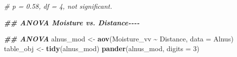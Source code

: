 \documentclass[
]{article}
\newenvironment{Shaded}{\begin{snugshade}}{\end{snugshade}}
\newcommand{\AttributeTok}[1]{\textcolor[rgb]{0.13,0.29,0.53}{#1}}
\newcommand{\CommentTok}[1]{\textcolor[rgb]{0.56,0.35,0.01}{\textit{#1}}}
\newcommand{\DecValTok}[1]{\textcolor[rgb]{0.00,0.00,0.81}{#1}}
\newcommand{\DocumentationTok}[1]{\textcolor[rgb]{0.56,0.35,0.01}{\textbf{\textit{#1}}}}
\newcommand{\FunctionTok}[1]{\textcolor[rgb]{0.13,0.29,0.53}{\textbf{#1}}}
\newcommand{\NormalTok}[1]{#1}
\newcommand{\OtherTok}[1]{\textcolor[rgb]{0.56,0.35,0.01}{#1}}
\newcommand{\SpecialCharTok}[1]{\textcolor[rgb]{0.81,0.36,0.00}{\textbf{#1}}}
\begin{document}
\begin{Shaded}
\begin{Highlighting}[]
\CommentTok{\# p = 0.58, df = 4, not significant. }

\DocumentationTok{\#\# ANOVA Moisture vs. Distance{-}{-}{-}{-}}

\DocumentationTok{\#\# ANOVA}
\NormalTok{alnus\_mod }\OtherTok{\textless{}{-}} \FunctionTok{aov}\NormalTok{(Moisture\_vv }\SpecialCharTok{\textasciitilde{}}\NormalTok{ Distance, }\AttributeTok{data =}\NormalTok{ Alnus)}
\NormalTok{table\_obj }\OtherTok{\textless{}{-}} \FunctionTok{tidy}\NormalTok{(alnus\_mod)}
\FunctionTok{pander}\NormalTok{(alnus\_mod, }\AttributeTok{digits =} \DecValTok{3}\NormalTok{)}
\end{Highlighting}
\end{Shaded}
\end{document}
